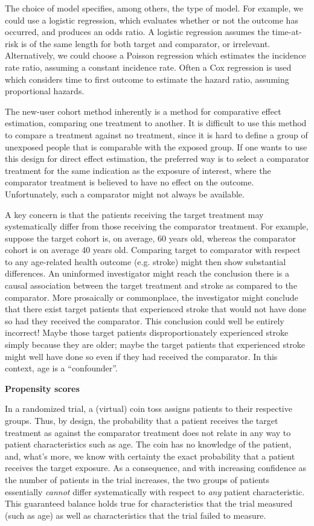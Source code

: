 \documentclass[11pt]{book}
\let\BeginKnitrBlock\begin \let\EndKnitrBlock\end
\begin{document}
The choice of model specifies, among others, the type of model. For
example, we could use a logistic regression, which evaluates whether or
not the outcome has occurred, and produces an odds ratio. A logistic
regression assumes the time-at-risk is of the same length for both
target and comparator, or irrelevant. Alternatively, we could choose a
Poisson regression which estimates the incidence rate ratio, assuming a
constant incidence rate. Often a Cox regression is used which considers
time to first outcome to estimate the hazard ratio, assuming
proportional hazards.

\BeginKnitrBlock{rmdimportant}
The new-user cohort method inherently is a method for comparative effect
estimation, comparing one treatment to another. It is difficult to use
this method to compare a treatment against no treatment, since it is
hard to define a group of unexposed people that is comparable with the
exposed group. If one wants to use this design for direct effect
estimation, the preferred way is to select a comparator treatment for
the same indication as the exposure of interest, where the comparator
treatment is believed to have no effect on the outcome. Unfortunately,
such a comparator might not always be available.
\EndKnitrBlock{rmdimportant}

A key concern is that the patients receiving the target treatment may
systematically differ from those receiving the comparator treatment. For
example, suppose the target cohort is, on average, 60 years old, whereas
the comparator cohort is on average 40 years old. Comparing target to
comparator with respect to any age-related health outcome (e.g. stroke)
might then show substantial differences. An uninformed investigator
might reach the conclusion there is a causal association between the
target treatment and stroke as compared to the comparator. More
prosaically or commonplace, the investigator might conclude that there
exist target patients that experienced stroke that would not have done
so had they received the comparator. This conclusion could well be
entirely incorrect! Maybe those target patients disproportionately
experienced stroke simply because they are older; maybe the target
patients that experienced stroke might well have done so even if they
had received the comparator. In this context, age is a ``confounder''.

\textbf{Propensity scores}

In a randomized trial, a (virtual) coin toss assigns patients to their
respective groups. Thus, by design, the probability that a patient
receives the target treatment as against the comparator treatment does
not relate in any way to patient characteristics such as age. The coin
has no knowledge of the patient, and, what's more, we know with
certainty the exact probability that a patient receives the target
exposure. As a consequence, and with increasing confidence as the number
of patients in the trial increases, the two groups of patients
essentially \emph{cannot} differ systematically with respect to
\emph{any} patient characteristic. This guaranteed balance holds true
for characteristics that the trial measured (such as age) as well as
characteristics that the trial failed to measure.
\end{document}
